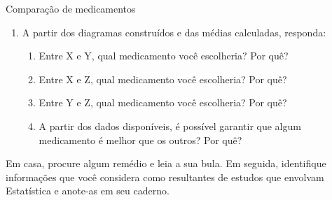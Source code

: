 \begin{task}{ Comparação de medicamentos}
\begin{enumerate}
\item {} 
A partir dos diagramas construídos e das médias calculadas, responda:
\begin{enumerate}
\item Entre X e Y, qual medicamento você escolheria? Por quê?
\item Entre X e Z, qual medicamento você escolheria? Por quê?
\item Entre Y e Z, qual medicamento você escolheria? Por quê?
\item A partir dos dados disponíveis, é possível garantir que algum medicamento é melhor que os outros? Por quê?
\end{enumerate}
\end{enumerate}
\end{task}

\begin{research}

Em casa, procure algum remédio e leia a sua bula. Em seguida, identifique informações que você considera como resultantes de estudos que envolvam Estatística e anote-as em seu caderno.

\end{research}


